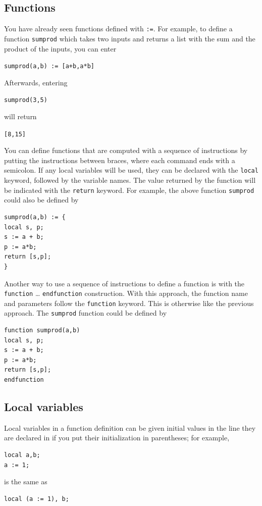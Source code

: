 \documentclass[a4paper,11pt]{book}
\begin{document}
\subsection{Functions}

You have already seen functions defined with \texttt{:=}.  For
example, to define a function \texttt{sumprod} which takes two inputs
and returns a list with the sum and the product of the inputs, you can
enter
\begin{center}
{\tt sumprod(a,b) := [a+b,a*b]}
\end{center}
Afterwards, entering
\begin{center}
{\tt sumprod(3,5)}
\end{center}
will return
\begin{center}
{\tt [8,15]}
\end{center}

You can define functions that are computed with a sequence of
instructions by putting the instructions between braces, where each
command ends with a semicolon.   If any local variables will be used,
they can be declared with the \texttt{local} keyword,
followed by the variable names.   The value returned by the function
will be indicated with the \texttt{return} keyword.  For
example, the above function \texttt{sumprod} could also be defined by
\begin{verbatim}
sumprod(a,b) := {
local s, p;
s := a + b;
p := a*b;
return [s,p];
}
\end{verbatim}

Another way to use a sequence of instructions to define a function is
with the \texttt{function} \ldots
\texttt{endfunction} construction. With this
approach, the function name and parameters follow the
\texttt{function} keyword.  This is otherwise like the previous
approach.  The \texttt{sumprod} function could be defined by
\begin{verbatim}
function sumprod(a,b)
local s, p;
s := a + b;
p := a*b;
return [s,p];
endfunction
\end{verbatim}

\subsection{Local variables}

Local variables in a function definition can be given initial values
in the line they are declared in if you put their initialization in
parentheses; for example,
\begin{verbatim}
local a,b;
a := 1;
\end{verbatim}
is the same as
\begin{verbatim}
local (a := 1), b;
\end{verbatim}
\end{document}
